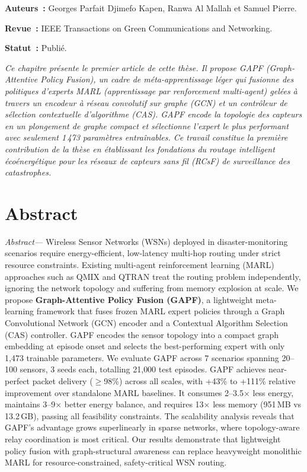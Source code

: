 \label{sec:Theme1}

\vspace{0.5cm}
\noindent\textbf{Auteurs~:} Georges Parfait Djimefo Kapen, Ranwa Al Mallah et Samuel Pierre.

\noindent\textbf{Revue~:} IEEE Transactions on Green Communications and Networking.

\noindent\textbf{Statut~:} Publié.

\vspace{0.3cm}
\noindent\textit{Ce chapitre présente le premier article de cette thèse. Il propose GAPF (Graph-Attentive Policy Fusion), un cadre de méta-apprentissage léger qui fusionne des politiques d'experts MARL (apprentissage par renforcement multi-agent) gelées à travers un encodeur à réseau convolutif sur graphe (GCN) et un contrôleur de sélection contextuelle d'algorithme (CAS). GAPF encode la topologie des capteurs en un plongement de graphe compact et sélectionne l'expert le plus performant avec seulement 1\,473 paramètres entraînables. Ce travail constitue la première contribution de la thèse en établissant les fondations du routage intelligent écoénergétique pour les réseaux de capteurs sans fil (RCsF) de surveillance des catastrophes.}

\vspace{0.5cm}

\section{Abstract}
\textit{Abstract—} Wireless Sensor Networks (WSNs) deployed in disaster-monitoring scenarios require energy-efficient, low-latency multi-hop routing under strict resource constraints. Existing multi-agent reinforcement learning (MARL) approaches such as QMIX and QTRAN treat the routing problem independently, ignoring the network topology and suffering from memory explosion at scale. We propose \textbf{Graph-Attentive Policy Fusion (GAPF)}, a lightweight meta-learning framework that fuses frozen MARL expert policies through a Graph Convolutional Network (GCN) encoder and a Contextual Algorithm Selection (CAS) controller. GAPF encodes the sensor topology into a compact graph embedding at episode onset and selects the best-performing expert with only 1{,}473 trainable parameters. We evaluate GAPF across 7 scenarios spanning 20--100 sensors, 3 seeds each, totalling 21{,}000 test episodes. GAPF achieves near-perfect packet delivery ($\geq$98\%) across all scales, with +43\% to +111\% relative improvement over standalone MARL baselines. It consumes 2--3.5$\times$ less energy, maintains 3--9$\times$ better energy balance, and requires 13$\times$ less memory (951\,MB vs 13.2\,GB), passing all feasibility constraints. The scalability analysis reveals that GAPF's advantage grows superlinearly in sparse networks, where topology-aware relay coordination is most critical. Our results demonstrate that lightweight policy fusion with graph-structural awareness can replace heavyweight monolithic MARL for resource-constrained, safety-critical WSN routing.

